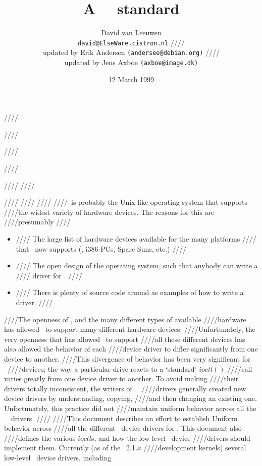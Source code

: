////\documentclass{article}
\begin{document}
////\title{A \linux\ \cdrom\ standard}
////\author{David van Leeuwen\\{\normalsize\tt david@ElseWare.cistron.nl}
////\\{\footnotesize updated by Erik Andersen {\tt(andersee@debian.org)}}
////\\{\footnotesize updated by Jens Axboe {\tt(axboe@image.dk)}}}
////\date{12 March 1999}
////
////\maketitle
////
////
////
////\linux\ is probably the Unix-like operating system that supports
////the widest variety of hardware devices. The reasons for this are
////presumably 
////\begin{itemize} 
////\item 
////  The large list of hardware devices available for the many platforms
////  that \linux\ now supports (\ie, i386-PCs, Sparc Suns, etc.)
////\item 
////  The open design of the operating system, such that anybody can write a
////  driver for \linux.
////\item 
////  There is plenty of source code around as examples of how to write a driver.
////\end{itemize}
////The openness of \linux, and the many different types of available
////hardware has allowed \linux\ to support many different hardware devices.
////Unfortunately, the very openness that has allowed \linux\ to support
////all these different devices has also allowed the behavior of each
////device driver to differ significantly from one device to another.
////This divergence of behavior has been very significant for \cdrom\
////devices; the way a particular drive reacts to a `standard' $ioctl()$
////call varies greatly from one device driver to another. To avoid making
////their drivers totally inconsistent, the writers of \linux\ \cdrom\
////drivers generally created new device drivers by understanding, copying,
////and then changing an existing one. Unfortunately, this practice did not
////maintain uniform behavior across all the \linux\ \cdrom\ drivers. 
////
////This document describes an effort to establish Uniform behavior across
////all the different \cdrom\ device drivers for \linux. This document also
////defines the various $ioctl$s, and how the low-level \cdrom\ device
////drivers should implement them. Currently (as of the \linux\ 2.1.$x$
////development kernels) several low-level \cdrom\ device drivers, including
\end{document}
